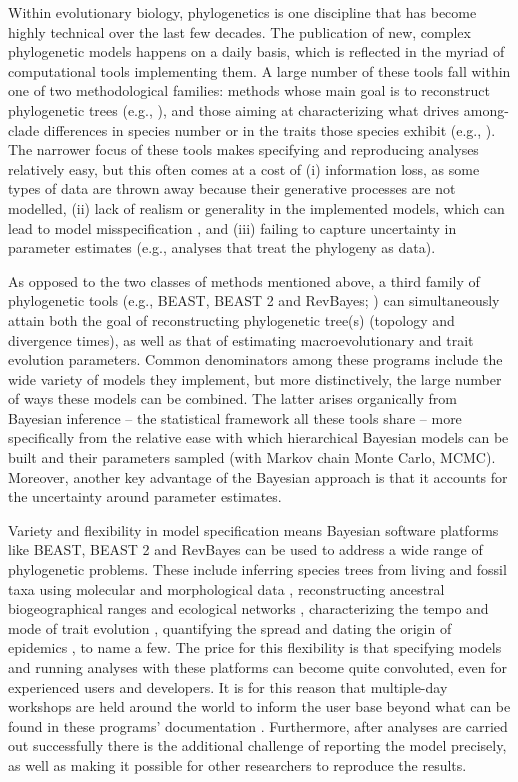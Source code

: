 \documentclass[10pt,letterpaper,table]{article}
\begin{document}
Within evolutionary biology, phylogenetics is one discipline that has
become highly technical over the last few decades.
The publication of new, complex phylogenetic models happens on a
daily basis, which is reflected in the myriad of computational tools
implementing them.
A large number of these tools fall within one of two methodological
families: methods whose main goal is to reconstruct phylogenetic trees 
(e.g.,
\cite{mrbayes,mcmctree,mpest,phyml,svdquartets,raxml,iqtree,astral3,svdquest}),
and those aiming at characterizing what drives among-clade differences
 in species number or in the traits those species exhibit (e.g.,
\cite{diversitree,phytools,bamm,geiger,mvmorph,rpanda,bite,cafe}).
The narrower focus of these tools makes specifying and reproducing
analyses relatively easy, but this often comes at a cost of (i)
information loss, as some types of data are thrown away because their
generative processes are not modelled, (ii) lack of realism or
generality in the implemented models, which can lead to model
misspecification \cite{mendes17,mendes18}, and (iii) failing to
capture uncertainty in parameter estimates (e.g., analyses that treat
the phylogeny as data).

As opposed to the two classes of methods mentioned above, a third
family of phylogenetic tools (e.g., BEAST, BEAST 2 and RevBayes;
\cite{beast,beast2,revbayes}) can simultaneously attain both the goal
of reconstructing phylogenetic tree(s) (topology and divergence
times), as well as that of estimating macroevolutionary and trait
evolution parameters.
Common denominators among these programs include the wide variety of
models they implement, but more distinctively, the large number of
ways these models can be combined.
The latter arises organically from Bayesian inference -- the
statistical framework all these tools share -- more specifically from
the relative ease with which hierarchical Bayesian models can be 
built and their parameters sampled (with Markov chain Monte Carlo,
MCMC).
Moreover, another key advantage of the Bayesian approach is that it
accounts for the uncertainty around parameter estimates.

Variety and flexibility in model specification means Bayesian software
platforms like BEAST, BEAST 2 and RevBayes can be used to address a
wide range of phylogenetic problems. 
These include inferring species trees from living and fossil taxa
using molecular and morphological data
\cite{gavryushkina17,ogilvie21,zhang21}, reconstructing ancestral
biogeographical ranges \cite{lemey10,landis18} and ecological networks
\cite{braga20}, characterizing the tempo and mode of trait evolution
\cite{may19,bite}, quantifying the spread and dating the origin of
epidemics \cite{faria21,douglas21}, to name a few.
The price for this flexibility is that specifying models and running
analyses with these platforms can become quite convoluted,
even for experienced users and developers.
It is for this reason that multiple-day workshops are held around the
world to inform the user base beyond what can be found in these programs'
documentation \cite{taming,revworkshop}.
Furthermore, after analyses are carried out successfully there is the
additional challenge of reporting the model precisely, as well as
making it possible for other researchers to reproduce the results.
\end{document}
